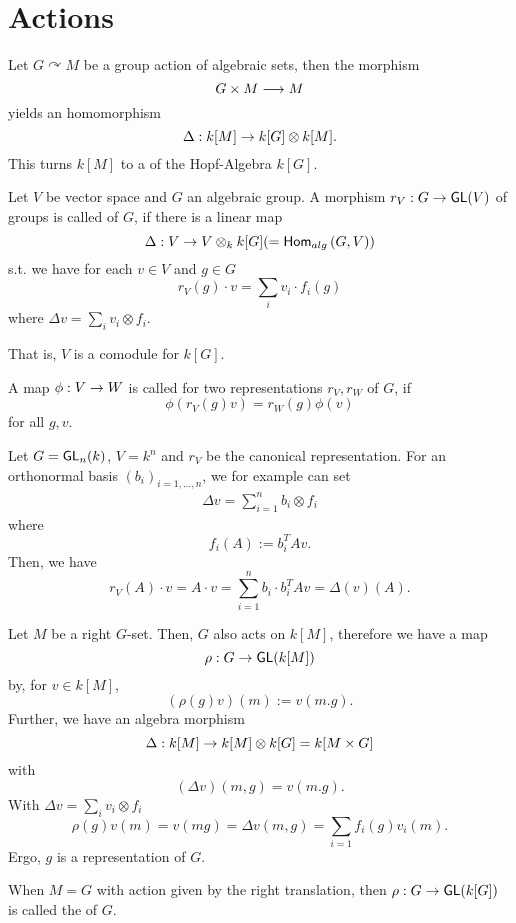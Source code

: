 \section{Actions}

\begin{remark}
	Let $G \curvearrowright M$ be a group action of algebraic sets, then the morphism
	\[ G\times M \overset{}{\longrightarrow} M \]
	yields an homomorphism
	\[ \Delta : k[M] \overset{}{\rightarrow} k[G]\otimes k[M].  \]
	This turns $k[M]$ to a  of the Hopf-Algebra $k[G]$.
\end{remark}

\begin{definition}
	Let $V$ be vector space and $G$ an algebraic group. A morphism $r_V : G \overset{}{\rightarrow} \textsf{GL}(V)$ of groups is called  of $G$, if there is a linear map
	\[ \Delta : V \overset{}{\rightarrow} V \otimes_k k[G] ( = \textsf{Hom}_{alg}\left(G, V\right)) \]
	s.t. we have for each $v \in V$ and $g \in G$
	\[r_V(g)\cdot v = \sum_{i} v_i \cdot  f_i(g)  \]
	where $\Delta v =\sum_{i} v_i \otimes f_i $.
	
	That is, $V$ is a comodule for $k[G]$.
	
	A map $\phi : V \overset{}{\rightarrow} W$ is called  for two representations $r_V, r_W$ of $G$, if
	\[ \phi(r_V(g) v) = r_W(g)\phi(v) \]
	for all $g,v$.
\end{definition}
\begin{example}
	Let $G = \textsf{GL}_n(k)$, $V = k^n$ and $r_V$ be the canonical representation. For an orthonormal basis $(b_i)_{i = 1,\ldots, n}$, we for example can set
	\begin{align*}
	\Delta v = \sum_{i = 1}^n b_i \otimes f_i
	\end{align*}
	where
	\[ f_i(A) := b_i^T A v. \]
	Then, we have 
	\[ r_V(A) \cdot v = A \cdot v = \sum_{i= 1}^nb_i \cdot b_i^T A v = \Delta(v)(A). \]
\end{example}

\begin{example}
	Let $M$ be a right $G$-set. Then, $G$ also acts on $k[M]$, therefore we have a map
	\[ \rho : G \overset{}{\rightarrow} \textsf{GL}(k[M]) \]
	by, for $v \in k[M]$,
	\[ (\rho(g)v)(m) := v(m.g). \]
	Further, we have an algebra morphism
	\[ \Delta : k[M] \overset{}{\rightarrow} k[M] \otimes k[G] = k[M\times G] \]
	with
	\[ (\Delta v) (m, g) = v(m.g). \]
	With $\Delta v = \sum_{i} v_i \otimes f_i$
	\[ \rho(g) v(m) = v(mg) = \Delta v(m, g) = \sum_{i= 1}f_i(g)v_i(m). \]
	Ergo, $g$ is a representation of $G$.
	
	
	When $M = G$ with action given by the right translation, then $\rho : G \overset{}{\rightarrow} \textsf{GL}(k[G])$ is called the  of $G$.
\end{example}

